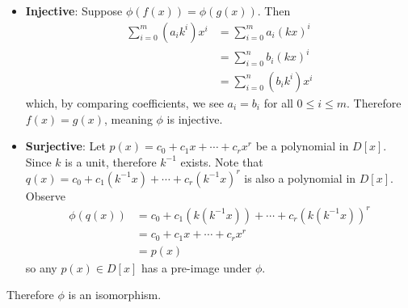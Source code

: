 \begin{questions}
\begin{itemize}
        \item \textbf{Injective}: Suppose $\phi(f(x)) = \phi(g(x))$. Then
        \begin{align*}
            \sum_{i=0}^m(a_ik^i)x^i &= \sum_{i=0}^ma_i(kx)^i\\
            &= \sum_{i=0}^nb_i(kx)^i\\
            &= \sum_{i=0}^n(b_ik^i)x^i
        \end{align*}
        which, by comparing coefficients, we see $a_i = b_i$ for all $0 \leq i \leq m$. Therefore $f(x) = g(x)$, meaning $\phi$ is injective.
        
        \item \textbf{Surjective}: Let $p(x) = c_0 + c_1x + \cdots + c_rx^r$ be a polynomial in $D[x]$. Since $k$ is a unit, therefore $k^{-1}$ exists. Note that $q(x) = c_0 + c_1(k^{-1}x) + \cdots + c_r(k^{-1}x)^r$ is also a polynomial in $D[x]$. Observe
        \begin{align*}
            \phi(q(x)) &= c_0 + c_1(k(k^{-1}x)) + \cdots + c_r(k(k^{-1}x))^r\\
            &= c_0 + c_1x + \cdots + c_rx^r\\
            &= p(x)
        \end{align*}
        so any $p(x) \in D[x]$ has a pre-image under $\phi$.
    \end{itemize}
    Therefore $\phi$ is an isomorphism.
\end{questions}
